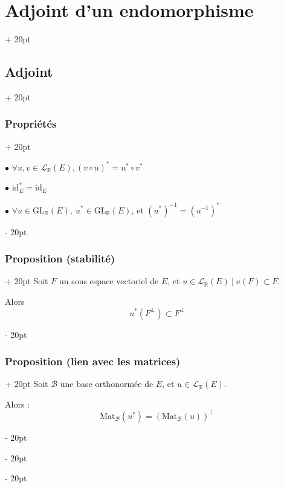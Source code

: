 \documentclass[a4paper, 12pt, twoside]{article}
\newcommand{\R}{\mathbb{R}} %
\newcommand{\lr}[1]{\left( #1 \right)}
\newcommand{\ind}[1][20pt]{\advance\leftskip + #1}
\newcommand{\deind}[1][20pt]{\advance\leftskip - #1}
\newenvironment{indt}[2][20pt]{#2 \par \ind[#1]}{\par \deind} %
\begin{document}
\begin{indt}{\section{Adjoint d'un endomorphisme}}
\begin{indt}{\subsection{Adjoint}}
\begin{indt}{\subsubsection{Propriétés}}
                \vspace{6pt}
            
                $\bullet$ $\forall u, v \in \mathcal L_\R(E), \lr{v \circ u}^* = u^* \circ v^*$
            
                \vspace{6pt}
            
                $\bullet$ $\mathrm{id}_E^* = \mathrm{id}_E$
            
                \vspace{6pt}
            
                $\bullet$ $\forall u \in \mathrm{GL}_\R(E),\ u^* \in \mathrm{GL}_\R(E)$, et $\lr{u^*}^{-1} = \lr{u^{-1}}^*$
            \end{indt}
            
            \vspace{12pt}
            
            \begin{indt}{\subsubsection{Proposition (stabilité)}}
                Soit $F$ un sous espace vectoriel de $E$, et $u \in \mathcal L_\R(E)\ |\ u(F) \subset F$.
            
                Alors
                \[
                    u^*(F^\perp) \subset F^\perp
                \]
            \end{indt}
            
            \vspace{12pt}
            
            \begin{indt}{\subsubsection{Proposition (lien avec les matrices)}}
                Soit $\mathcal B$ une base orthonormée de $E$, et $u \in \mathcal L_\R(E)$.
            
                Alors :
                \[
                    \mathrm{Mat}_{\mathcal B}(u^*) = \lr{\mathrm{Mat}_{\mathcal B}(u)}^\top
                \]
            \end{indt}
        \end{indt}

        \vspace{12pt}
        

\end{indt}
\end{document}
